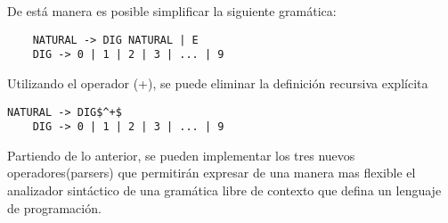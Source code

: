 	De está manera es posible simplificar la siguiente gramática:
	
	\begin{lstlisting}
	NATURAL -> DIG NATURAL | E
	DIG -> 0 | 1 | 2 | 3 | ... | 9
	\end{lstlisting}
	
	Utilizando el operador (+), se puede eliminar la definición recursiva explícita
	
	\begin{lstlisting}[mathescape]
	NATURAL -> DIG$^+$
	DIG -> 0 | 1 | 2 | 3 | ... | 9
	\end{lstlisting}
	
	Partiendo de lo anterior, se pueden implementar los tres nuevos operadores(parsers) que permitirán expresar de una manera mas flexible el analizador sintáctico de una gramática libre de contexto que defina un lenguaje de programación.
	
	





